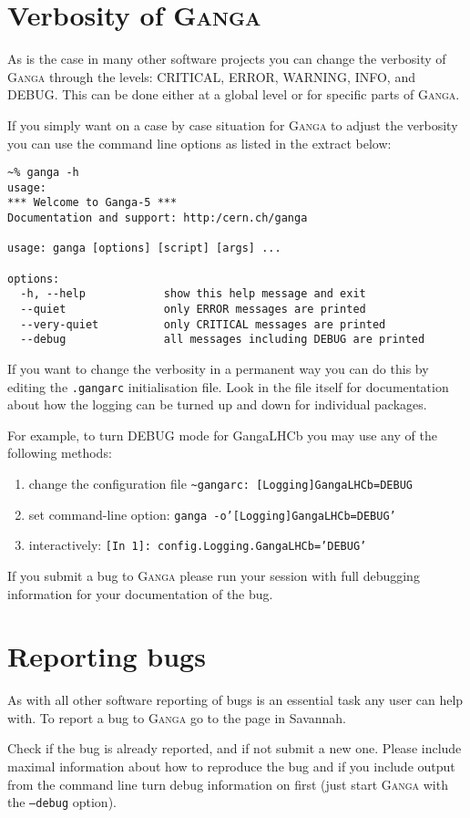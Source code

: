 \documentclass{howto}
\def\ganga {\textsc{Ganga}\xspace}
\begin{document}
\section{Verbosity of \ganga}
As is the case in many other software projects you can change the verbosity of
\ganga through the levels: CRITICAL, ERROR, WARNING, INFO, and DEBUG. This can
be done either at a global level or for specific parts of \ganga.

If you simply want on a case by case situation for \ganga to adjust the
verbosity you can use the command line options as listed in the extract below:
\begin{verbatim}
~% ganga -h
usage:
*** Welcome to Ganga-5 ***
Documentation and support: http:/cern.ch/ganga

usage: ganga [options] [script] [args] ...

options:
  -h, --help            show this help message and exit
  --quiet               only ERROR messages are printed
  --very-quiet          only CRITICAL messages are printed
  --debug               all messages including DEBUG are printed
\end{verbatim}

If you want to change the verbosity in a permanent way you can do this by
editing the \texttt{.gangarc} initialisation file. Look in the file itself for
documentation about how the logging can be turned up and down for individual
packages. 

For example, to turn DEBUG mode for GangaLHCb you may use any of the following methods:
\begin{enumerate}
\item change the configuration file \texttt{\~{}gangarc: [Logging]GangaLHCb=DEBUG} 
\item set command-line option: \texttt{ganga -o'[Logging]GangaLHCb=DEBUG'}
\item interactively: \texttt{[In 1]: config.Logging.GangaLHCb='DEBUG'}
\end{enumerate}


If you submit a bug to \ganga please run your session with full debugging
information for your documentation of the bug.

\section{Reporting bugs}
As with all other software reporting of bugs is an essential task any user can
help with. To report a bug to \ganga go to the page in Savannah.
\begin{seealso}
\end{seealso}
Check if the bug is already reported, and if not submit a new one. Please
include maximal information about how to reproduce the bug and if you include
output from the command line turn debug information on first (just start
\ganga with the \texttt{--debug} option).
\end{document}
